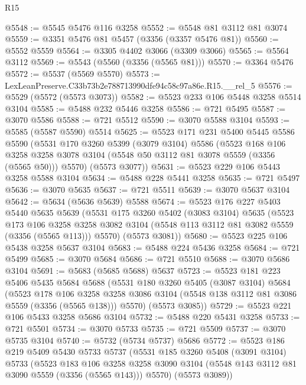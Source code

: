 \begin{lexlean}{R15}
\begin{coremodule}
@5548 := @5545 @5476 @116 @3258
@5552 := @5548 @81 @3112 @81 @3074
@5559 := @3351 @5476 @81 @5457 (@3356 (@3357 @5476 @81))
@5560 := @5552 @5559
@5564 := @3305 @4402 @3066 (@3309 @3066)
@5565 := @5564 @3112
@5569 := @5543 (@5560 (@3356 (@5565 @81)))
@5570 := @3364 @5476
@5572 := @5537 (@5569 @5570)
@5573 := LexLeanPreserve.C33b73b2e788713990dfe94c58c97a86e.R15.__rel_5
@5576 := @5529 (@5572 (@5573 @3073))
@5582 := @5523 @233 @106 @5448 @3258 @5514 @3104
@5585 := @5488 @232 @5446 @3258
@5586 := @721 @5495
@5587 := @3070 @5586
@5588 := @721 @5512
@5590 := @3070 @5588 @3104
@5593 := @5585 (@5587 @5590) @5514
@5625 := @5523
    @171
    @231
    @5400
    @5445
    @5586
    @5590
    (@5531
      @170
      @3260
      @5399
      (@3079 @3104)
      @5586
      (@5523
        @168
        @106
        @3258
        @3258
        @3078
        @3104
        (@5548 @50 @3112 @81 @3078 @5559 (@3356 (@5565 @50)))
        @5570)
      (@5573 @3077))
@5631 := @5523 @229 @106 @5443 @3258 @5588 @3104
@5634 := @5488 @228 @5441 @3258
@5635 := @721 @5497
@5636 := @3070 @5635
@5637 := @721 @5511
@5639 := @3070 @5637 @3104
@5642 := @5634 (@5636 @5639) @5588
@5674 := @5523
    @176
    @227
    @5403
    @5440
    @5635
    @5639
    (@5531
      @175
      @3260
      @5402
      (@3083 @3104)
      @5635
      (@5523
        @173
        @106
        @3258
        @3258
        @3082
        @3104
        (@5548 @113 @3112 @81 @3082 @5559 (@3356 (@5565 @113)))
        @5570)
      (@5573 @3081))
@5680 := @5523 @225 @106 @5438 @3258 @5637 @3104
@5683 := @5488 @224 @5436 @3258
@5684 := @721 @5499
@5685 := @3070 @5684
@5686 := @721 @5510
@5688 := @3070 @5686 @3104
@5691 := @5683 (@5685 @5688) @5637
@5723 := @5523
    @181
    @223
    @5406
    @5435
    @5684
    @5688
    (@5531
      @180
      @3260
      @5405
      (@3087 @3104)
      @5684
      (@5523
        @178
        @106
        @3258
        @3258
        @3086
        @3104
        (@5548 @138 @3112 @81 @3086 @5559 (@3356 (@5565 @138)))
        @5570)
      (@5573 @3085))
@5729 := @5523 @221 @106 @5433 @3258 @5686 @3104
@5732 := @5488 @220 @5431 @3258
@5733 := @721 @5501
@5734 := @3070 @5733
@5735 := @721 @5509
@5737 := @3070 @5735 @3104
@5740 := @5732 (@5734 @5737) @5686
@5772 := @5523
    @186
    @219
    @5409
    @5430
    @5733
    @5737
    (@5531
      @185
      @3260
      @5408
      (@3091 @3104)
      @5733
      (@5523
        @183
        @106
        @3258
        @3258
        @3090
        @3104
        (@5548 @143 @3112 @81 @3090 @5559 (@3356 (@5565 @143)))
        @5570)
      (@5573 @3089))

\end{coremodule}
\end{lexlean}

